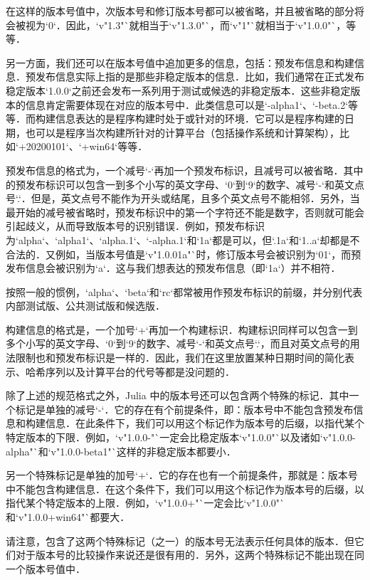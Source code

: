 在这样的版本号值中，次版本号和修订版本号都可以被省略，并且被省略的部分将会被视为`0`．因此，`v"1.3"`就相当于`v"1.3.0"`，而`v"1"`就相当于`v"1.0.0"`，等等．

另一方面，我们还可以在版本号值中追加更多的信息，包括：预发布信息和构建信息．预发布信息实际上指的是那些非稳定版本的信息．比如，我们通常在正式发布稳定版本`1.0.0`之前还会发布一系列用于测试或候选的非稳定版本．这些非稳定版本的信息肯定需要体现在对应的版本号中．此类信息可以是`-alpha1`、`-beta.2`等等．而构建信息表达的是程序构建时处于或针对的环境．它可以是程序构建的日期，也可以是程序当次构建所针对的计算平台（包括操作系统和计算架构），比如`+20200101`、`+win64`等等．

预发布信息的格式为，一个减号`-`再加一个预发布标识，且减号可以被省略．其中的预发布标识可以包含一到多个小写的英文字母、`0`到`9`的数字、减号`-`和英文点号`.`．但是，英文点号不能作为开头或结尾，且多个英文点号不能相邻．另外，当最开始的减号被省略时，预发布标识中的第一个字符还不能是数字，否则就可能会引起歧义，从而导致版本号的识别错误．例如，预发布标识为`alpha`、`alpha1`、`alpha.1`、`-alpha.1`和`1a`都是可以，但`.1a`和`1..a`却都是不合法的．又例如，当版本号值是`v"1.0.01a"`时，修订版本号会被识别为`01`，而预发布信息会被识别为`a`．这与我们想表达的预发布信息（即`1a`）并不相符．

按照一般的惯例，`alpha`、`beta`和`rc`都常被用作预发布标识的前缀，并分别代表内部测试版、公共测试版和候选版．

构建信息的格式是，一个加号`+`再加一个构建标识．构建标识同样可以包含一到多个小写的英文字母、`0`到`9`的数字、减号`-`和英文点号`.`，而且对英文点号的用法限制也和预发布标识是一样的．因此，我们在这里放置某种日期时间的简化表示、哈希序列以及计算平台的代号等都是没问题的．

除了上述的规范格式之外，Julia 中的版本号还可以包含两个特殊的标记．其中一个标记是单独的减号`-`．它的存在有个前提条件，即：版本号中不能包含预发布信息和构建信息．在此条件下，我们可以用这个标记作为版本号的后缀，以指代某个特定版本的下限．例如，`v"1.0.0-"`一定会比稳定版本`v"1.0.0"`以及诸如`v"1.0.0-alpha"`和`v"1.0.0-beta1"`这样的非稳定版本都要小．

另一个特殊标记是单独的加号`+`．它的存在也有一个前提条件，那就是：版本号中不能包含构建信息．在这个条件下，我们可以用这个标记作为版本号的后缀，以指代某个特定版本的上限．例如，`v"1.0.0+"`一定会比`v"1.0.0"`和`v"1.0.0+win64"`都要大．

请注意，包含了这两个特殊标记（之一）的版本号无法表示任何具体的版本．但它们对于版本号的比较操作来说还是很有用的．另外，这两个特殊标记不能出现在同一个版本号值中．

